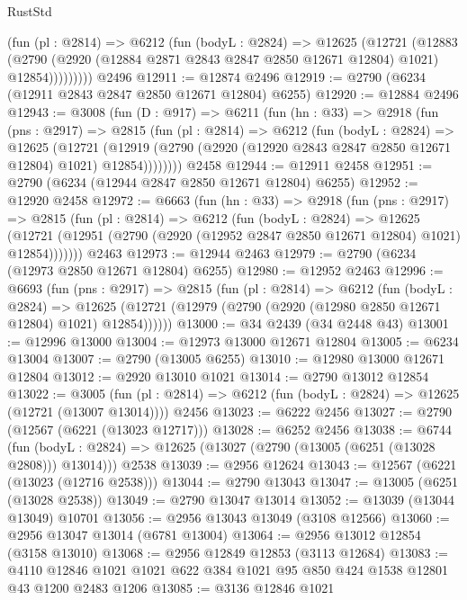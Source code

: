 \begin{lexlean}{RustStd}
\begin{coremodule}
            (fun (pl : @2814) =>
            @6212
              (fun (bodyL : @2824) =>
              @12625
                (@12721
                  (@12883
                    (@2790
                      (@2920 (@12884 @2871 @2843 @2847 @2850 @12671 @12804) @1021)
                      @12854)))))))))
    @2496
@12911 := @12874 @2496
@12919 := @2790 (@6234 (@12911 @2843 @2847 @2850 @12671 @12804) @6255)
@12920 := @12884 @2496
@12943 := @3008
    (fun (D : @917) =>
    @6211
      (fun (hn : @33) =>
      @2918
        (fun (pns : @2917) =>
        @2815
          (fun (pl : @2814) =>
          @6212
            (fun (bodyL : @2824) =>
            @12625
              (@12721
                (@12919 (@2790 (@2920 (@12920 @2843 @2847 @2850 @12671 @12804) @1021) @12854))))))))
    @2458
@12944 := @12911 @2458
@12951 := @2790 (@6234 (@12944 @2847 @2850 @12671 @12804) @6255)
@12952 := @12920 @2458
@12972 := @6663
    (fun (hn : @33) =>
    @2918
      (fun (pns : @2917) =>
      @2815
        (fun (pl : @2814) =>
        @6212
          (fun (bodyL : @2824) =>
          @12625
            (@12721 (@12951 (@2790 (@2920 (@12952 @2847 @2850 @12671 @12804) @1021) @12854)))))))
    @2463
@12973 := @12944 @2463
@12979 := @2790 (@6234 (@12973 @2850 @12671 @12804) @6255)
@12980 := @12952 @2463
@12996 := @6693
    (fun (pns : @2917) =>
    @2815
      (fun (pl : @2814) =>
      @6212
        (fun (bodyL : @2824) =>
        @12625 (@12721 (@12979 (@2790 (@2920 (@12980 @2850 @12671 @12804) @1021) @12854))))))
@13000 := @34 @2439 (@34 @2448 @43)
@13001 := @12996 @13000
@13004 := @12973 @13000 @12671 @12804
@13005 := @6234 @13004
@13007 := @2790 (@13005 @6255)
@13010 := @12980 @13000 @12671 @12804
@13012 := @2920 @13010 @1021
@13014 := @2790 @13012 @12854
@13022 := @3005
    (fun (pl : @2814) => @6212 (fun (bodyL : @2824) => @12625 (@12721 (@13007 @13014))))
    @2456
@13023 := @6222 @2456
@13027 := @2790 (@12567 (@6221 (@13023 @12717)))
@13028 := @6252 @2456
@13038 := @6744
    (fun (bodyL : @2824) => @12625 (@13027 (@2790 (@13005 (@6251 (@13028 @2808))) @13014)))
    @2538
@13039 := @2956 @12624
@13043 := @12567 (@6221 (@13023 (@12716 @2538)))
@13044 := @2790 @13043
@13047 := @13005 (@6251 (@13028 @2538))
@13049 := @2790 @13047 @13014
@13052 := @13039 (@13044 @13049) @10701
@13056 := @2956 @13043 @13049 (@3108 @12566)
@13060 := @2956 @13047 @13014 (@6781 @13004)
@13064 := @2956 @13012 @12854 (@3158 @13010)
@13068 := @2956 @12849 @12853 (@3113 @12684)
@13083 := @4110 @12846 @1021 @1021 @622 @384 @1021 @95 @850 @424 @1538 @12801 @43 @1200 @2483 @1206
@13085 := @3136 @12846 @1021

\end{coremodule}
\end{lexlean}
